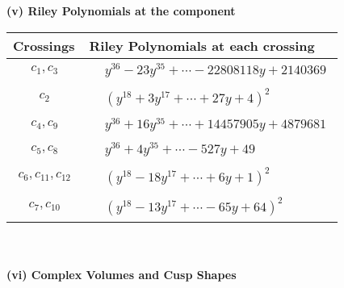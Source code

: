 \documentclass[1p]{elsarticle_modified}
\theoremstyle{definition}
\begin{document}
\newpage\renewcommand{\arraystretch}{1}
\flushleft \textbf{(v) Riley Polynomials at the component}\newline \\
\begin{tabular}{m{50pt}|m{274pt}}
Crossings & \hspace{64pt}Riley Polynomials at each crossing \\
\hline $$\begin{aligned}c_{1},c_{3}\end{aligned}$$&$\begin{aligned}
&y^{36}-23 y^{35}+\cdots-22808118 y+2140369
\end{aligned}$\\
\hline $$\begin{aligned}c_{2}\end{aligned}$$&$\begin{aligned}
&(y^{18}+3 y^{17}+\cdots+27 y+4)^{2}
\end{aligned}$\\
\hline $$\begin{aligned}c_{4},c_{9}\end{aligned}$$&$\begin{aligned}
&y^{36}+16 y^{35}+\cdots+14457905 y+4879681
\end{aligned}$\\
\hline $$\begin{aligned}c_{5},c_{8}\end{aligned}$$&$\begin{aligned}
&y^{36}+4 y^{35}+\cdots-527 y+49
\end{aligned}$\\
\hline $$\begin{aligned}c_{6},c_{11},c_{12}\end{aligned}$$&$\begin{aligned}
&(y^{18}-18 y^{17}+\cdots+6 y+1)^{2}
\end{aligned}$\\
\hline $$\begin{aligned}c_{7},c_{10}\end{aligned}$$&$\begin{aligned}
&(y^{18}-13 y^{17}+\cdots-65 y+64)^{2}
\end{aligned}$\\
\hline
\end{tabular}\\~\\
\newpage\flushleft \textbf{(vi) Complex Volumes and Cusp Shapes}
\end{document}
